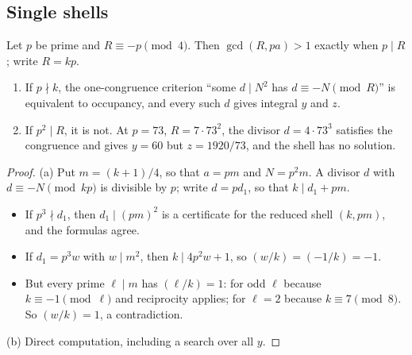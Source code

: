 \subsection{Single shells}\label{ssec:singleshells}

\begin{proposition}\label{prop:noncoprime}
Let $p$ be prime and $R\equiv-p\pmod4$. Then $\gcd(R,pa)>1$ exactly when $p\mid R$; write $R=kp$.
\begin{enumerate}[label=(\alph*)]
\item If $p\nmid k$, the one-congruence criterion ``some $d\mid N^2$ has $d\equiv-N\pmod R$'' is equivalent to occupancy, and every such $d$ gives integral $y$ and $z$.
\item If $p^2\mid R$, it is not. At $p=73$, $R=7\cdot73^2$, the divisor $d=4\cdot73^3$ satisfies the congruence and gives $y=60$ but $z=1920/73$, and the shell has no solution.
\end{enumerate}
\end{proposition}
\begin{proof}
(a) Put $m=(k+1)/4$, so that $a=pm$ and $N=p^2m$. A divisor $d$ with $d\equiv-N\pmod{kp}$ is divisible by $p$; write $d=pd_1$, so that $k\mid d_1+pm$.
\begin{itemize}
\item If $p^3\nmid d_1$, then $d_1\mid(pm)^2$ is a certificate for the reduced shell $(k,pm)$, and the formulas agree.
\item If $d_1=p^3w$ with $w\mid m^2$, then $k\mid4p^2w+1$, so $(w/k)=(-1/k)=-1$.
\item But every prime $\ell\mid m$ has $(\ell/k)=1$: for odd $\ell$ because $k\equiv-1\pmod\ell$ and reciprocity applies; for $\ell=2$ because $k\equiv7\pmod8$. So $(w/k)=1$, a contradiction.
\end{itemize}
(b) Direct computation, including a search over all $y$.
\end{proof}

